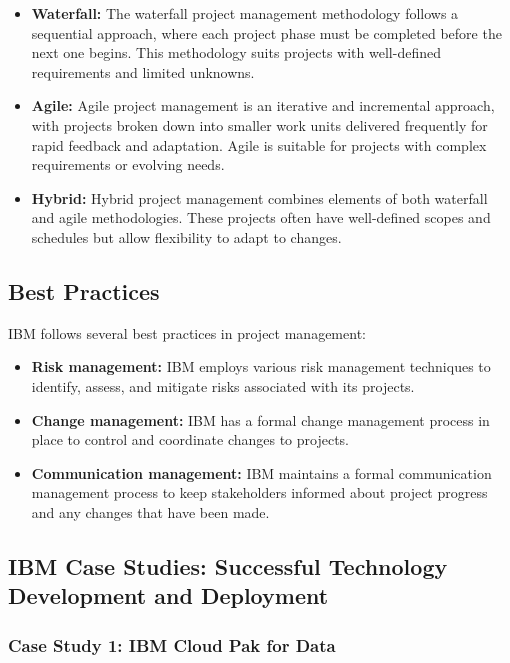 \begin{itemize}
    \item \textbf{Waterfall:} The waterfall project management methodology follows a sequential approach, where each project phase must be completed before the next one begins. This methodology suits projects with well-defined requirements and limited unknowns.
    \item \textbf{Agile:} Agile project management is an iterative and incremental approach, with projects broken down into smaller work units delivered frequently for rapid feedback and adaptation. Agile is suitable for projects with complex requirements or evolving needs.
    \item \textbf{Hybrid:} Hybrid project management combines elements of both waterfall and agile methodologies. These projects often have well-defined scopes and schedules but allow flexibility to adapt to changes.
\end{itemize}

\subsection{Best Practices}

IBM follows several best practices in project management:

\begin{itemize}
    \item \textbf{Risk management:} IBM employs various risk management techniques to identify, assess, and mitigate risks associated with its projects.
    \item \textbf{Change management:} IBM has a formal change management process in place to control and coordinate changes to projects.
    \item \textbf{Communication management:} IBM maintains a formal communication management process to keep stakeholders informed about project progress and any changes that have been made.
\end{itemize}

\subsection{IBM Case Studies: Successful Technology Development and Deployment}

\subsubsection{Case Study 1: IBM Cloud Pak for Data}

